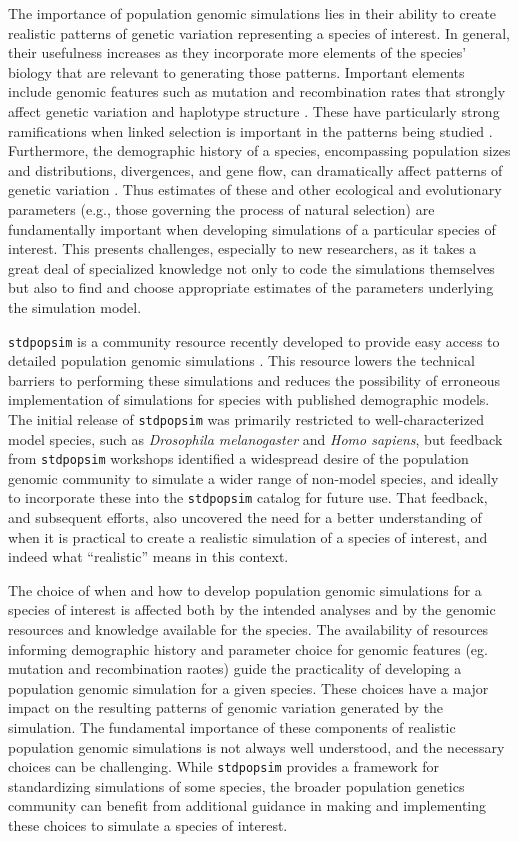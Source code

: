 \documentclass[hidelinks]{article}
\newcommand{\stdpopsim}{\texttt{stdpopsim}\xspace}
\begin{document}
The importance of population genomic simulations lies in their ability
to create realistic patterns of genetic variation representing a species of interest.
In general, their usefulness increases 
as they incorporate more elements of the species' biology that are
relevant to generating those patterns. Important
elements include genomic features such as mutation and recombination
rates that strongly affect genetic variation and haplotype structure
\citep{Nachman2002}. These have particularly strong ramifications 
when linked selection is important in the patterns being studied \citep{Cutter2013}.
Furthermore, the demographic history of a species,
encompassing population sizes and distributions, divergences, and gene flow, can
dramatically affect patterns of genetic variation \citep{Teshima2006}. Thus
estimates of these and other ecological and evolutionary parameters (e.g., those governing
the process of natural selection) are fundamentally important when
developing simulations of a particular species of interest.
This presents challenges, especially to new researchers,
as it takes a great deal of specialized knowledge not only to code the simulations themselves
but also to find and choose appropriate estimates of the parameters underlying the simulation model.

\stdpopsim is a community resource recently developed to provide easy
access to detailed population genomic simulations \citep{Adrion2020}. This
resource lowers the technical barriers to performing these simulations
and reduces the possibility of erroneous implementation of simulations
for species with published demographic models. 
The initial release of \stdpopsim was
primarily restricted to well-characterized model species, such as
\emph{Drosophila melanogaster} and \emph{Homo sapiens},
but feedback from \stdpopsim workshops identified a widespread desire
of the population genomic community to simulate
a wider range of non-model species,
and ideally to incorporate these into the \stdpopsim catalog for future use.
That feedback, and subsequent efforts, also uncovered the need for a 
better understanding of when it is practical to create a realistic
simulation of a species of interest, and indeed what ``realistic'' means in this context.

The choice of when and how to develop population genomic
simulations for a species of interest is affected both by the intended
analyses and by the genomic resources and knowledge available for the
species. The availability of resources informing demographic history 
and parameter choice for genomic features (eg. mutation and recombination
raotes) guide the practicality
of developing a population genomic simulation for a given species.
These choices have a major impact on the resulting patterns of
genomic variation generated by the simulation. The fundamental
importance of these components of realistic population genomic
simulations is not always well understood, and the necessary choices can
be challenging. While \stdpopsim provides a framework for standardizing
simulations of some species, the broader population genetics community
can benefit from additional guidance in making and implementing these
choices to simulate a species of interest.
\end{document}
